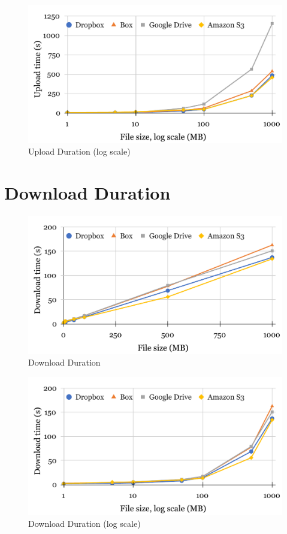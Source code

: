 \begin{figure} [!h]
    \centering
    \includegraphics[scale=0.6]{images/upload_log_chart}
    \caption{\label{fig:upload_log_duration}Upload Duration (log scale)}
\end{figure}

\section{Download Duration}

\begin{figure} [!h]
	\centering
	\includegraphics[scale=0.6]{images/download_chart}
	\caption{\label{fig:download_duration}Download Duration}
\end{figure}

\begin{figure} [!h]
	\centering
	\includegraphics[scale=0.6]{images/download_log_chart}
	\caption{\label{fig:download_log_duration}Download Duration (log scale)}
\end{figure}

